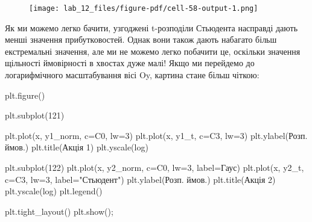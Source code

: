 \documentclass[
  letterpaper,
]{report}
\newenvironment{Shaded}{\begin{snugshade}}{\end{snugshade}}
\newcommand{\DecValTok}[1]{\textcolor[rgb]{0.68,0.00,0.00}{#1}}
\newcommand{\NormalTok}[1]{\textcolor[rgb]{0.00,0.23,0.31}{#1}}
\newcommand{\OperatorTok}[1]{\textcolor[rgb]{0.37,0.37,0.37}{#1}}
\newcommand{\StringTok}[1]{\textcolor[rgb]{0.13,0.47,0.30}{#1}}
\begin{document}
\begin{figure}[H]

{\centering \texttt{[image: lab\_12\_files/figure-pdf/cell-58-output-1.png]}

}

\end{figure}

Як ми можемо легко бачити, узгоджені t-розподіли Стьюдента насправді
дають менші значення прибутковостей. Однак вони також дають набагато
більш екстремальні значення, але ми не можемо легко побачити це,
оскільки значення щільності ймовірності в хвостах дуже малі! Якщо ми
перейдемо до логарифмічного масштабування вісі Oy, картина стане більш
чіткою:

\begin{Shaded}
\begin{Highlighting}[]
\NormalTok{plt.figure()}

\NormalTok{plt.subplot(}\DecValTok{121}\NormalTok{)}

\NormalTok{plt.plot(x, y1\_norm, c}\OperatorTok{=}\StringTok{\textquotesingle{}C0\textquotesingle{}}\NormalTok{, lw}\OperatorTok{=}\DecValTok{3}\NormalTok{)}
\NormalTok{plt.plot(x, y1\_t, c}\OperatorTok{=}\StringTok{\textquotesingle{}C3\textquotesingle{}}\NormalTok{, lw}\OperatorTok{=}\DecValTok{3}\NormalTok{)}
\NormalTok{plt.ylabel(}\StringTok{\textquotesingle{}Розп. ймов.\textquotesingle{}}\NormalTok{)}
\NormalTok{plt.title(}\StringTok{\textquotesingle{}Акція 1\textquotesingle{}}\NormalTok{)}
\NormalTok{plt.yscale(}\StringTok{\textquotesingle{}log\textquotesingle{}}\NormalTok{)}

\NormalTok{plt.subplot(}\DecValTok{122}\NormalTok{)}
\NormalTok{plt.plot(x, y2\_norm, c}\OperatorTok{=}\StringTok{\textquotesingle{}C0\textquotesingle{}}\NormalTok{, lw}\OperatorTok{=}\DecValTok{3}\NormalTok{, label}\OperatorTok{=}\StringTok{\textquotesingle{}Гаус\textquotesingle{}}\NormalTok{)}
\NormalTok{plt.plot(x, y2\_t, c}\OperatorTok{=}\StringTok{\textquotesingle{}C3\textquotesingle{}}\NormalTok{, lw}\OperatorTok{=}\DecValTok{3}\NormalTok{, label}\OperatorTok{=}\StringTok{"Стьюдент"}\NormalTok{)}
\NormalTok{plt.ylabel(}\StringTok{\textquotesingle{}Розп. ймов.\textquotesingle{}}\NormalTok{)}
\NormalTok{plt.title(}\StringTok{\textquotesingle{}Акція 2\textquotesingle{}}\NormalTok{)}
\NormalTok{plt.yscale(}\StringTok{\textquotesingle{}log\textquotesingle{}}\NormalTok{)}
\NormalTok{plt.legend()}

\NormalTok{plt.tight\_layout()}
\NormalTok{plt.show()}\OperatorTok{;}
\end{Highlighting}
\end{Shaded}
\end{document}
